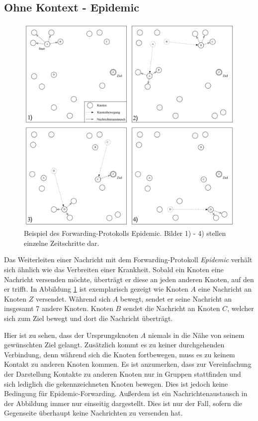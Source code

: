 \documentclass[a4paper, 12pt]{article}
\begin{document}
\subsection{Ohne Kontext - Epidemic}
\begin{figure}[H]
    \centering
    \includegraphics[width=\textwidth]{img/epidemic.pdf}
    \caption{Beispiel des Forwarding-Protokolls Epidemic. Bilder 1) - 4) stellen einzelne Zeitschritte dar.}
    \label{fig:epidemic}
\end{figure}
Das Weiterleiten einer Nachricht mit dem Forwarding-Protokoll \emph{Epidemic} \cite{vahdat2000epidemic} verhält sich ähnlich wie das Verbreiten einer Krankheit. Sobald ein Knoten eine Nachricht versenden möchte, überträgt er diese an jeden anderen Knoten, auf den er trifft. 
In Abbildung \ref{fig:epidemic} ist exemplarisch gezeigt wie Knoten $A$ eine Nachricht an Knoten $Z$ versendet. Während sich $A$ bewegt, sendet er seine Nachricht an insgesamt 7 andere Knoten. Knoten $B$ sendet die Nachricht an Knoten $C$, welcher sich zum Ziel bewegt und dort die Nachricht überträgt.

Hier ist zu sehen, dass der Ursprungsknoten $A$ niemals in die Nähe von seinem gewünschten Ziel gelangt. Zusätzlich kommt es zu keiner durchgehenden Verbindung, denn während sich die Knoten fortbewegen, muss es zu keinem Kontakt zu anderen Knoten kommen.
Es ist anzumerken, dass zur Vereinfachung der Darstellung Kontakte zu anderen Knoten nur in Gruppen stattfinden und sich lediglich die gekennzeichneten Knoten bewegen. Dies ist jedoch keine Bedingung für Epidemic-Forwarding. Außerdem ist ein Nachrichtenaustausch in der Abbildung immer nur einseitig dargestellt. Dies ist nur der Fall, sofern die Gegenseite überhaupt keine Nachrichten zu versenden hat.
\end{document}
